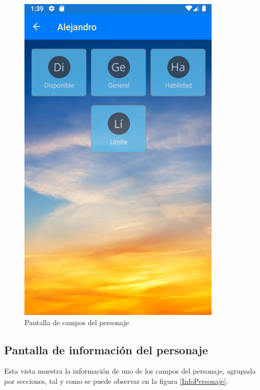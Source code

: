 \begin{figure}[H]
    \centering
    \includegraphics[scale=0.7]{Figures/Capturas/CamposPersonaje.png}
    \caption{Pantalla de campos del personaje}
    \label{CamposPersonaje}    
\end{figure}

\subsection{Pantalla de información del personaje}
Esta vista muestra la información de uno de los campos del personaje, agrupada por secciones, tal y como 
se puede observar en la figura \ref*{InfoPersonaje}.


